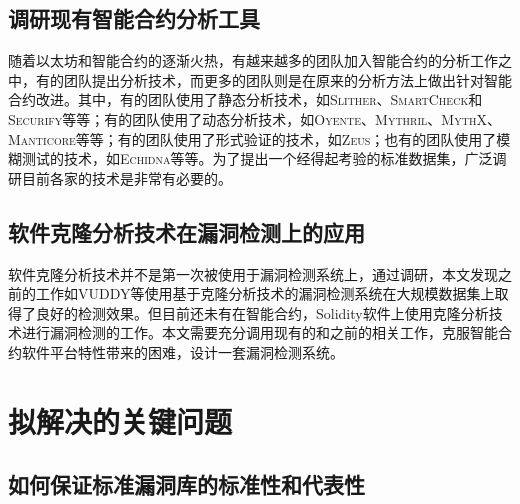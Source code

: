 \subsection{调研现有智能合约分析工具}

随着以太坊和智能合约的逐渐火热，有越来越多的团队加入智能合约的分析工作之中，有的团队提出分析技术，而更多的团队则是在原来的分析方法上做出针对智能合约改进。其中，有的团队使用了静态分析技术，如\textsc{Slither}\cite{slither}、\textsc{SmartCheck}\cite{smartcheck}和\textsc{Securify}\cite{securify}等等；有的团队使用了动态分析技术，如\textsc{Oyente}\cite{oyente}、\textsc{Mythril}\cite{mythril}、\textsc{MythX}\cite{mythx}、\textsc{Manticore}\cite{manticore}等等；有的团队使用了形式验证的技术，如\textsc{Zeus}\cite{zeus}；也有的团队使用了模糊测试的技术，如\textsc{Echidna}\cite{echidna}等等。为了提出一个经得起考验的标准数据集，广泛调研目前各家的技术是非常有必要的。

%

\subsection{软件克隆分析技术在漏洞检测上的应用}

软件克隆分析技术并不是第一次被使用于漏洞检测系统上，通过调研，本文发现之前的工作如VUDDY\cite{vuddy}等使用基于克隆分析技术的漏洞检测系统在大规模数据集上取得了良好的检测效果。但目前还未有在智能合约，Solidity软件上使用克隆分析技术进行漏洞检测的工作。本文需要充分调用现有的和之前的相关工作，克服智能合约软件平台特性带来的困难，设计一套漏洞检测系统。

\section{拟解决的关键问题}

\subsection{如何保证标准漏洞库的标准性和代表性}

